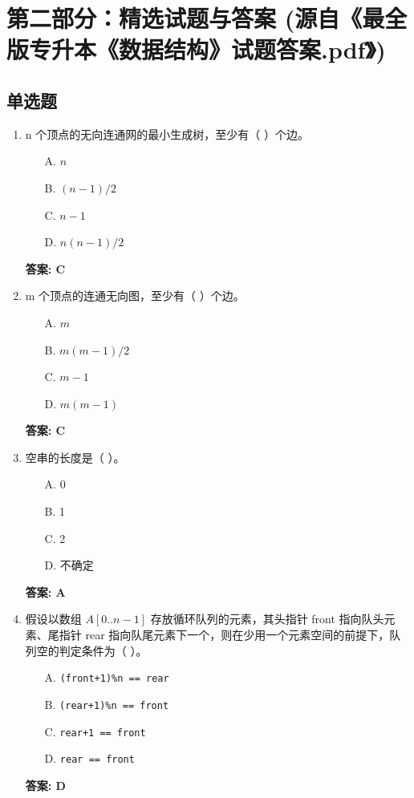 \documentclass[12pt, a4paper]{article}
\begin{document}
\section*{第二部分：精选试题与答案 (源自《最全版专升本《数据结构》试题答案.pdf》)}

\subsection*{单选题}
\begin{enumerate}
    \item n 个顶点的无向连通网的最小生成树，至少有（ ）个边。
    \begin{enumerate}
        \item[A.] $n$
        \item[B.] $(n-1)/2$
        \item[C.] $n-1$
        \item[D.] $n(n-1)/2$
    \end{enumerate}
    \textbf{答案: C}

    \item m 个顶点的连通无向图，至少有（ ）个边。
    \begin{enumerate}
        \item[A.] $m$
        \item[B.] $m(m-1)/2$
        \item[C.] $m-1$
        \item[D.] $m(m-1)$
    \end{enumerate}
    \textbf{答案: C}

    \item 空串的长度是（ ）。
    \begin{enumerate}
        \item[A.] 0
        \item[B.] 1
        \item[C.] 2
        \item[D.] 不确定
    \end{enumerate}
    \textbf{答案: A}

    \item 假设以数组 $A[0..n-1]$ 存放循环队列的元素，其头指针 front 指向队头元素、尾指针 rear 指向队尾元素下一个，则在少用一个元素空间的前提下，队列空的判定条件为（ ）。
    \begin{enumerate}
        \item[A.] \texttt{(front+1)\%n == rear}
        \item[B.] \texttt{(rear+1)\%n == front}
        \item[C.] \texttt{rear+1 == front}
        \item[D.] \texttt{rear == front}
    \end{enumerate}
    \textbf{答案: D}


\end{enumerate}
\end{document}
